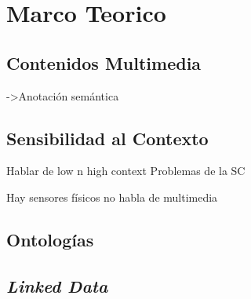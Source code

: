 \chapter{Marco Teorico}
\label{chp:Marco_Teorico}

\section{Contenidos Multimedia}
\label{sec:MT_ContenidosMultimedia}

->Anotación semántica

\section{Sensibilidad al Contexto}
\label{sec:MT_SensibilidadContexto}
Hablar de low n high context
Problemas de la SC \cite{Alegre2016}



Hay sensores físicos no habla de multimedia \cite{Iaz2014}

\section{Ontologías}
\label{sec:MT_Ontologias}

\section{\textit{Linked Data}}
\label{sec:MT_LinkedData}
